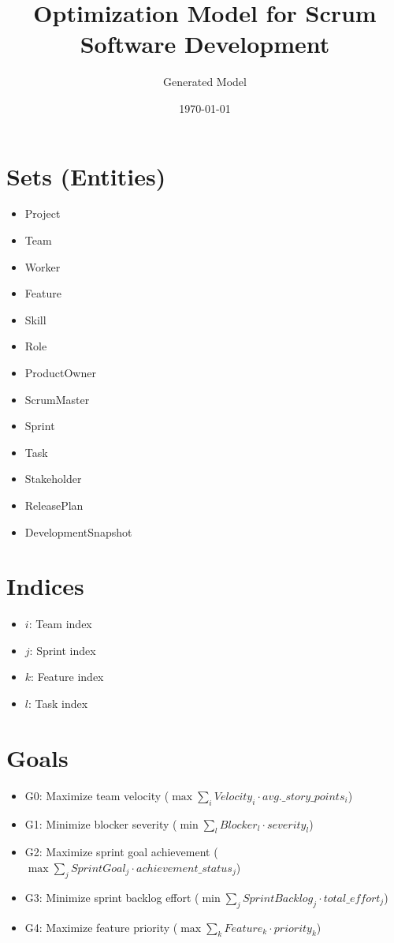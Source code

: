 \documentclass{article}
\title{Optimization Model for Scrum Software Development}
\author{Generated Model}
\date{\today}
\begin{document}
\maketitle
\tableofcontents

\section{Sets (Entities)}
\begin{itemize}
    \item Project
    \item Team
    \item Worker
    \item Feature
    \item Skill
    \item Role
    \item ProductOwner
    \item ScrumMaster
    \item Sprint
    \item Task
    \item Stakeholder
    \item ReleasePlan
    \item DevelopmentSnapshot
\end{itemize}

\section{Indices}
\begin{itemize}
    \item $i$: Team index
    \item $j$: Sprint index
    \item $k$: Feature index
    \item $l$: Task index
\end{itemize}

\section{Goals}
\begin{itemize}
    \item G0: Maximize team velocity ($\max \sum_{i} Velocity_{i} \cdot avg.\_story\_points_{i}$)
    \item G1: Minimize blocker severity ($\min \sum_{l} Blocker_{l} \cdot severity_{l}$)
    \item G2: Maximize sprint goal achievement ($\max \sum_{j} SprintGoal_{j} \cdot achievement\_status_{j}$)
    \item G3: Minimize sprint backlog effort ($\min \sum_{j} SprintBacklog_{j} \cdot total\_effort_{j}$)
    \item G4: Maximize feature priority ($\max \sum_{k} Feature_{k} \cdot priority_{k}$)
\end{itemize}
\end{document}
